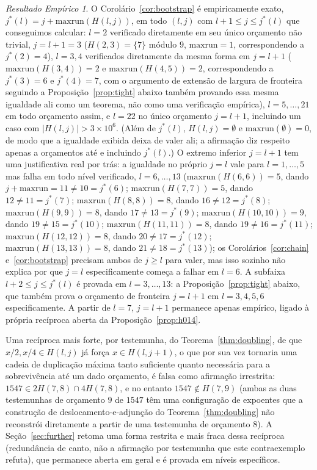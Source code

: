 \documentclass[11pt]{amsart}
\theoremstyle{plain}
\theoremstyle{definition}
\theoremstyle{remark}
\newtheorem{empresult}[theorem]{Resultado Emp\'irico}
\begin{document}
\begin{empresult}
\label{er:bootstrap}
O Corolário~\ref{cor:bootstrap} é empiricamente exato, $j^*(l) = j + \mathrm{maxrun}(H(l,j))$, em
todo $(l,j)$ com $l+1\le j\le j^*(l)$ que conseguimos calcular: $l=2$ verificado diretamente em seu
único orçamento não trivial, $j=l+1=3$ ($H(2,3)=\{7\}$ módulo $9$, $\mathrm{maxrun}=1$,
correspondendo a $j^*(2)=4$), $l=3,4$ verificados diretamente da mesma forma em $j=l+1$
($\mathrm{maxrun}(H(3,4))=2$ e $\mathrm{maxrun}(H(4,5))=2$, correspondendo a $j^*(3)=6$ e
$j^*(4)=7$, com o argumento de extensão de largura de fronteira seguindo a
Proposição~\ref{prop:tight} abaixo também provando essa mesma igualdade ali como um teorema, não
como uma verificação empírica), $l=5,\dots,21$ em todo orçamento assim, e $l=22$ no único orçamento
$j=l+1$, incluindo um caso com $|H(l,j)| > 3\times10^6$. (Além de $j^*(l)$, $H(l,j)=\emptyset$ e
$\mathrm{maxrun}(\emptyset)=0$, de modo que a igualdade exibida deixa de valer ali; a afirmação
diz respeito apenas a orçamentos até e incluindo $j^*(l)$.) O extremo inferior $j=l+1$ tem uma
justificativa real por trás: a igualdade no próprio $j=l$ vale para $l=1,\dots,5$ mas falha em todo
nível verificado, $l=6,\dots,13$ ($\mathrm{maxrun}(H(6,6))=5$, dando
$j+\mathrm{maxrun}=11\ne10=j^*(6)$; $\mathrm{maxrun}(H(7,7))=5$, dando $12\ne11=j^*(7)$;
$\mathrm{maxrun}(H(8,8))=8$, dando $16\ne12=j^*(8)$; $\mathrm{maxrun}(H(9,9))=8$, dando
$17\ne13=j^*(9)$; $\mathrm{maxrun}(H(10,10))=9$, dando $19\ne15=j^*(10)$;
$\mathrm{maxrun}(H(11,11))=8$, dando $19\ne16=j^*(11)$; $\mathrm{maxrun}(H(12,12))=8$, dando
$20\ne17=j^*(12)$; $\mathrm{maxrun}(H(13,13))=8$, dando $21\ne18=j^*(13)$); os
Corolários~\ref{cor:chain} e~\ref{cor:bootstrap} precisam ambos de $j\ge l$ para valer, mas isso
sozinho não explica por que $j=l$ especificamente começa a falhar em $l=6$. A subfaixa
$l+2\le j\le j^*(l)$ é provada em $l=3,\dots,13$: a Proposição~\ref{prop:tight} abaixo, que também
prova o orçamento de fronteira $j=l+1$ em $l=3,4,5,6$ especificamente. A partir de $l=7$, $j=l+1$
permanece apenas empírico, ligado à própria recíproca aberta da Proposição~\ref{prop:h014}.
\end{empresult}

Uma recíproca mais forte, por testemunha, do Teorema~\ref{thm:doubling}, de que $x/2,x/4\in H(l,j)$
já força $x\in H(l,j+1)$, o que por sua vez tornaria uma cadeia de duplicação máxima tanto
suficiente quanto necessária para a sobrevivência até um dado orçamento, é falsa como afirmação
irrestrita: $1547 \in 2H(7,8)\cap4H(7,8)$, e no entanto $1547 \notin H(7,9)$ (ambas as duas
testemunhas de orçamento $9$ de $1547$ têm uma configuração de expoentes que a construção de
deslocamento-e-adjunção do Teorema~\ref{thm:doubling} não reconstrói diretamente a partir de uma
testemunha de orçamento $8$). A Seção~\ref{sec:further} retoma uma forma restrita e mais fraca
dessa recíproca (redundância de canto, não a afirmação por testemunha que este contraexemplo
refuta), que permanece aberta em geral e é provada em níveis específicos.
\end{document}
